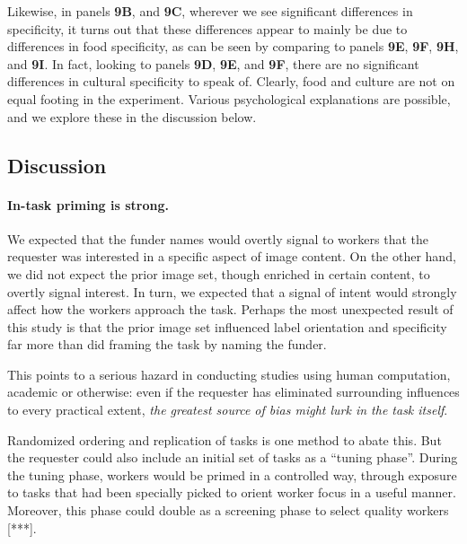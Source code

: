 \documentclass[a4paper]{report}
\begin{document}
Likewise, in panels \textbf{9B}, and \textbf{9C}, 
wherever we see significant differences in specificity, it turns out that
these differences appear to mainly be due to differences in food specificity,
as can be seen by comparing to panels \textbf{9E}, \textbf{9F}, \textbf{9H}, 
and \textbf{9I}.  In fact, looking to panels \textbf{9D}, \textbf{9E}, and 
\textbf{9F},
there are no significant differences in cultural specificity to speak of. 
Clearly, food and culture are not on equal footing in the experiment.  Various 
psychological explanations are possible, and we explore these in the 
discussion below.

\subsection*{Discussion}

\paragraph{In-task priming is strong.}  We expected that the funder names 
would overtly signal to workers that the requester was interested in a 
specific aspect of image content.  On the other hand, we did not 
expect the prior image set, though enriched in certain content, to overtly signal interest.  In turn, we expected that a signal of intent would 
strongly affect how the workers approach the task.  Perhaps the most 
unexpected result of this study is that the prior image set influenced label 
orientation and specificity far more than did framing the task by naming the
funder.

This points to a serious hazard in conducting studies using human computation,
academic or otherwise: even if the requester has 
eliminated surrounding influences to every practical extent, 
\textit{the greatest source of bias might lurk in the task itself}.

Randomized ordering and replication of tasks is one method to abate this.
But the requester could also include an initial set of tasks as a 
``tuning phase''.  During the tuning phase, workers would be primed in a 
controlled way, through exposure to tasks that had been specially picked to
orient worker focus in a useful manner.  Moreover, this phase could double as a
screening phase to select quality workers [***].
\end{document}
